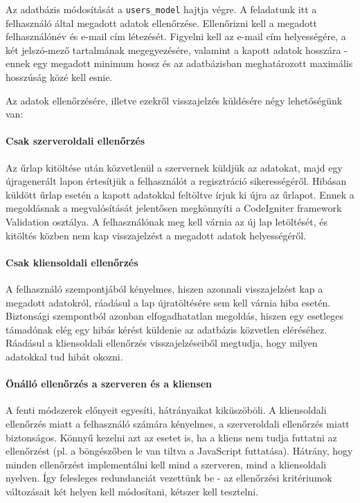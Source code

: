 \documentclass[12pt,a4paper,twoside]{article}
\begin{document}
Az adatbázis módosítását a \texttt{users\_model} hajtja végre. A feladatunk itt
a felhasználó által megadott adatok ellenőrzése. Ellenőrizni
kell a megadott felhasználónév és e-mail cím létezését. Figyelni kell az e-mail
cím helyességére, a két jelszó-mező tartalmának megegyezésére, valamint a kapott
adatok hosszára - ennek egy megadott minimum hossz és az adatbázisban
meghatározott maximális hosszúság közé kell esnie.

Az adatok ellenőrzésére, illetve ezekről visszajelzés küldésére négy
lehetőségünk van:

\paragraph{Csak szerveroldali ellenőrzés}
Az űrlap kitöltése után közvetlenül a szervernek küldjük az adatokat, majd egy
újragenerált lapon értesítjük a felhasználót a regisztráció sikerességéről.
Hibásan küldött űrlap esetén a kapott adatokkal feltöltve írjuk ki újra az
űrlapot. Ennek a megoldásnak a megvalósítását jelentősen megkönnyíti a
CodeIgniter framework Validation osztálya\cite{CI-Val}. A felhasználónak meg
kell várnia az új lap letöltését, és kitöltés közben nem kap visszajelzést a
megadott adatok helyességéről.

\paragraph{Csak kliensoldali ellenőrzés}
A felhasználó szempontjából kényelmes, hiszen azonnali visszajelzést kap a
megadott adatokról, ráadásul a lap újratöltésére sem kell várnia hiba
esetén. Biztonsági szempontból azonban elfogadhatatlan megoldás, hiszen egy
esetleges támadónak elég egy hibás kérést küldenie az adatbázis közvetlen
eléréséhez. Ráadásul a kliensoldali ellenőrzés visszajelzéseiből megtudja, hogy
milyen adatokkal tud hibát okozni.

\paragraph{Önálló ellenőrzés a szerveren és a kliensen}
A fenti módszerek előnyeit egyesíti, hátrányaikat kiküszöböli. A kliensoldali
ellenőrzés miatt a felhasználó számára kényelmes, a szerveroldali ellenőrzés
miatt biztonságos. Könnyű kezelni azt az esetet is, ha a kliens nem tudja
futtatni az ellenőrzést (pl. a böngészőben le van tiltva a JavaScript
futtatása). Hátrány, hogy minden ellenőrzést implementálni kell mind
a szerveren, mind a kliensoldali nyelven. Így felesleges redundanciát vezettünk
be - az ellenőrzési kritériumok változásait két helyen kell módosítani, kétszer
kell tesztelni.
\end{document}
